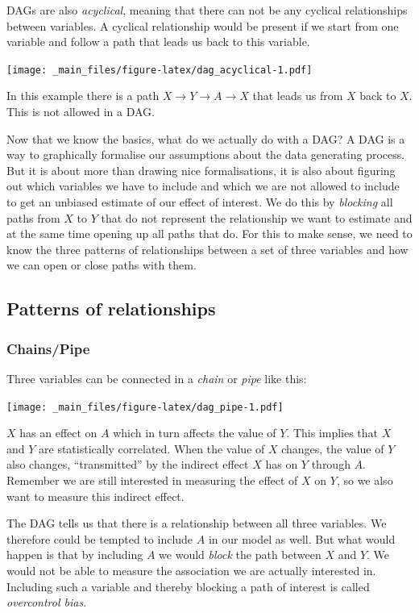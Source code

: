 \documentclass[
]{book}
\begin{document}
DAGs are also \emph{acyclical}, meaning that there can not be any cyclical
relationships between variables. A cyclical relationship would be present if we
start from one variable and follow a path that leads us back to this variable.

\texttt{[image: \_main\_files/figure-latex/dag\_acyclical-1.pdf]}

In this example there is a path \(X \rightarrow Y \rightarrow A \rightarrow X\)
that leads us from \(X\) back to \(X\). This is not allowed in a DAG.

Now that we know the basics, what do we actually do with a DAG? A DAG is a way
to graphically formalise our assumptions about the data generating process. But
it is about more than drawing nice formalisations, it is also about figuring out
which variables we have to include and which we are not allowed to include to
get an unbiased estimate of our effect of interest. We do this by \emph{blocking} all
paths from \(X\) to \(Y\) that do not represent the relationship we want to estimate
and at the same time opening up all paths that do. For this to make sense, we
need to know the three patterns of relationships between a set of three
variables and how we can open or close paths with them.

\hypertarget{patterns-of-relationships}{%
\subsection{Patterns of relationships}\label{patterns-of-relationships}}

\hypertarget{chainspipe}{%
\subsubsection{Chains/Pipe}\label{chainspipe}}

Three variables can be connected in a \emph{chain} or \emph{pipe} like this:

\texttt{[image: \_main\_files/figure-latex/dag\_pipe-1.pdf]}

\(X\) has an effect on \(A\) which in turn affects the value of \(Y\). This implies
that \(X\) and \(Y\) are statistically correlated. When the value of \(X\) changes,
the value of \(Y\) also changes, ``transmitted'' by the indirect effect \(X\) has
on \(Y\) through \(A\). Remember we are still interested in measuring the effect of \(X\) on
\(Y\), so we also want to measure this indirect effect.

The DAG tells us that there is a relationship between all three variables. We
therefore could be tempted to include \(A\) in our model as well. But what would
happen is that by including \(A\) we would \emph{block} the path between \(X\) and \(Y\).
We would not be able to measure the association we are actually interested in.
Including such a variable and thereby blocking a path of interest is called
\emph{overcontrol bias}.
\end{document}
